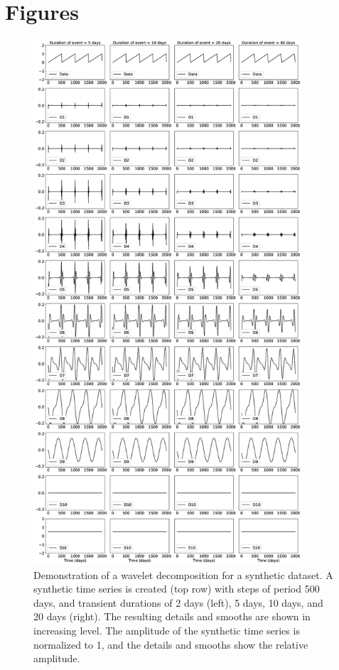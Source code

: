 \documentclass{article}
\begin{document}
\newpage

\section*{Figures}

\begin{figure}
\noindent\includegraphics[width=10cm, trim={0cm 0cm 0cm 0cm},clip]{figures/500_DS.eps}
\caption{Demonstration of a wavelet decomposition for a synthetic dataset. A synthetic time series is created (top row) with steps of period 500 days, and transient durations of 2 days (left), 5 days, 10 days, and 20 days (right). The resulting details and smooths are shown in increasing level. The amplitude of the synthetic time series is normalized to 1, and the details and smooths show the relative amplitude.}
\label{pngfiguresample}
\end{figure}
\end{document}
